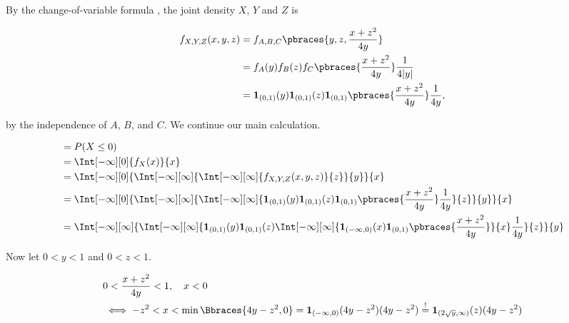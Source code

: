 \begin{solution}
\begin{enumerate}[label = (\alph*)]
    By the change-of-variable formula \cite[Lecture 3, Slide 32]{EStat}, the joint density $X$, $Y$ and $Z$ is
    
    \begin{align*}
        f_{X, Y, Z}(x, y, z)
        & =
        f_{A, B, C}
        \pbraces
        {
            y, z, \frac{x + z^2}{4 y}
        } \\
        & =
        f_A(y) f_B(z) f_C \pbraces{\frac{x + z^2}{4 y}} \frac{1}{4 |y|} \\
        & =
        \mathbf 1_{(0, 1)}(y)
        \mathbf 1_{(0, 1)}(z)
        \mathbf 1_{(0, 1)}
        \pbraces{\frac{x + z^2}{4 y}}
        \frac{1}{4 y},
    \end{align*}
    
    by the independence of $A$, $B$, and $C$.
    We continue our main calculation.

    \begin{align*}
        & =
        P(X \leq 0) \\
        & =
        \Int[-\infty][0]
        {
            f_X(x)
        }{x} \\
        & =
        \Int[-\infty][0]
        {
            \Int[-\infty][\infty]
            {
                \Int[-\infty][\infty]
                {
                    f_{X, Y, Z}(x, y, z)
                }{z}
            }{y}
        }{x} \\
        & =
        \Int[-\infty][0]
        {
            \Int[-\infty][\infty]
            {
                \Int[-\infty][\infty]
                {
                    \mathbf 1_{(0, 1)}(y)
                    \mathbf 1_{(0, 1)}(z)
                    \mathbf 1_{(0, 1)}
                    \pbraces{\frac{x + z^2}{4 y}}
                    \frac{1}{4 y}
                }{z}
            }{y}
        }{x} \\
        & =
        \Int[-\infty][\infty]
        {
            \Int[-\infty][\infty]
            {
                \mathbf 1_{(0, 1)}(y)
                \mathbf 1_{(0, 1)}(z)
                \Int[-\infty][\infty]
                {
                    \mathbf 1_{(-\infty, 0)}(x)
                    \mathbf 1_{(0, 1)}
                    \pbraces
                    {
                        \frac{x + z^2}{4 y}
                    }
                }{x}
                \frac{1}{4 y}
            }{z}
        }{y}
    \end{align*}

    Now let $0 < y < 1$ and $0 < z < 1$.

    \begin{align*}
        &
        0 < \frac{x + z^2}{4 y} < 1, \quad x < 0 \\
        & \iff
        -z^2 < x < \min \Bbraces{4 y - z^2, 0}
        =
        \mathbf 1_{(-\infty, 0)}(4 y - z^2) (4 y - z^2)
        \stackrel{!}{=}
        \mathbf 1_{(2 \sqrt y, \infty)}(z) (4 y - z^2)
    \end{align*}


\end{enumerate}
\end{solution}
